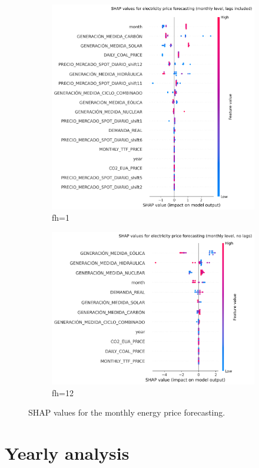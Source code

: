 \begin{figure}[H]
\centering
    \begin{subfigure}{.45\textwidth}
        \centering
        \includegraphics[width=1\linewidth]{images/analysis/shap-monthly}
        \caption{fh=1}
    \end{subfigure}
    \begin{subfigure}{.45\textwidth}
        \centering
        \includegraphics[width=1\linewidth]{images/analysis/shap-monthly-nolags}
        \caption{fh=12}
    \end{subfigure}

    \caption{SHAP values for the monthly energy price forecasting.}
    \label{fig:shap-monthly}
\end{figure}



\section{Yearly analysis}